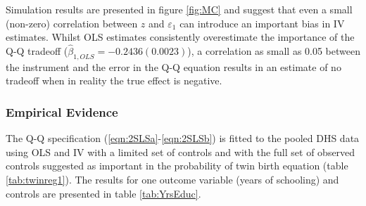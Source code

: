 \documentclass{article}[11pt,subeqn]
\begin{document}
\begin{spacing}{1.25}
Simulation results are presented in figure \ref{fig:MC} and suggest that even a small (non-zero) correlation between $z$ and $\varepsilon_1$ can introduce an 
important bias in IV estimates.  Whilst OLS estimates consistently overestimate the importance of the Q-Q tradeoff ($\hat{\beta}_{1,OLS}=-0.2436 (0.0023)$), a correlation
as small as 0.05 between the instrument and the error in the Q-Q equation results in an estimate of no tradeoff when in reality the true effect is negative.

\subsubsection{Empirical Evidence}
\label{scn:EE}
The Q-Q specification (\ref{eqn:2SLSa}-\ref{eqn:2SLSb}) is fitted to the pooled DHS data using OLS and IV with a limited set of controls and with the full set of observed 
controls suggested as important in the probability of twin birth equation (table \ref{tab:twinreg1}).  The results for one outcome variable (years of schooling) and controls 
are presented in table \ref{tab:YrsEduc}.



\end{spacing}
\end{document}
